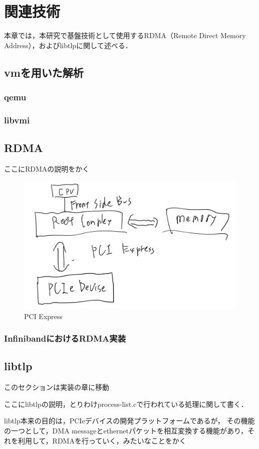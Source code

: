 \chapter{関連技術}
\label{chap:related_works}

本章では，本研究で基盤技術として使用するRDMA（Remote Direct Memory Address），およびlibtlpに関して述べる．

\section{vmを用いた解析}

\subsection{qemu}

\subsection{libvmi}

\section{RDMA}

ここにRDMAの説明をかく

\begin{figure}[htbp]
    \caption{PCI Express}
    \label{fig:zentai}
    \begin{center}
        \includegraphics[bb=0 0 1000 400,width=15cm]{img/tegaki/pcie.png}
    \end{center}
\end{figure}

\subsection{InfinibandにおけるRDMA実装}

\section{libtlp}

このセクションは実装の章に移動

ここにlibtlpの説明，とりわけprocess-list.cで行われている処理に関して書く．

libtlp本来の目的は，PCIeデバイスの開発プラットフォームであるが，
その機能の一つとして，DMA messageとethernetパケットを相互変換する機能があり，それを利用して，RDMAを行っていく，みたいなことをかく
